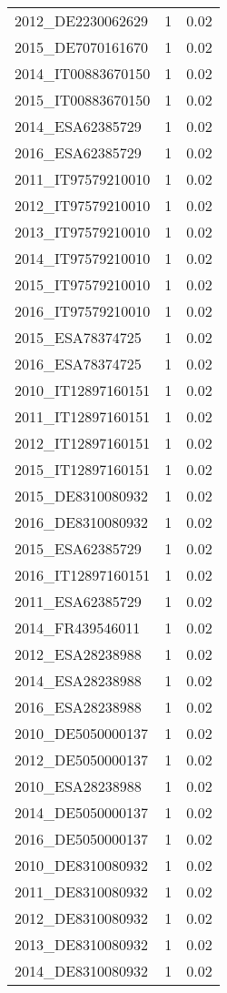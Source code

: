 \begin{table*}[htbp]
\begin{tabular}{lrr}
2012_DE2230062629 & 1 & 0.02 \\
2015_DE7070161670 & 1 & 0.02 \\
2014_IT00883670150 & 1 & 0.02 \\
2015_IT00883670150 & 1 & 0.02 \\
2014_ESA62385729 & 1 & 0.02 \\
2016_ESA62385729 & 1 & 0.02 \\
2011_IT97579210010 & 1 & 0.02 \\
2012_IT97579210010 & 1 & 0.02 \\
2013_IT97579210010 & 1 & 0.02 \\
2014_IT97579210010 & 1 & 0.02 \\
2015_IT97579210010 & 1 & 0.02 \\
2016_IT97579210010 & 1 & 0.02 \\
2015_ESA78374725 & 1 & 0.02 \\
2016_ESA78374725 & 1 & 0.02 \\
2010_IT12897160151 & 1 & 0.02 \\
2011_IT12897160151 & 1 & 0.02 \\
2012_IT12897160151 & 1 & 0.02 \\
2015_IT12897160151 & 1 & 0.02 \\
2015_DE8310080932 & 1 & 0.02 \\
2016_DE8310080932 & 1 & 0.02 \\
2015_ESA62385729 & 1 & 0.02 \\
2016_IT12897160151 & 1 & 0.02 \\
2011_ESA62385729 & 1 & 0.02 \\
2014_FR439546011 & 1 & 0.02 \\
2012_ESA28238988 & 1 & 0.02 \\
2014_ESA28238988 & 1 & 0.02 \\
2016_ESA28238988 & 1 & 0.02 \\
2010_DE5050000137 & 1 & 0.02 \\
2012_DE5050000137 & 1 & 0.02 \\
2010_ESA28238988 & 1 & 0.02 \\
2014_DE5050000137 & 1 & 0.02 \\
2016_DE5050000137 & 1 & 0.02 \\
2010_DE8310080932 & 1 & 0.02 \\
2011_DE8310080932 & 1 & 0.02 \\
2012_DE8310080932 & 1 & 0.02 \\
2013_DE8310080932 & 1 & 0.02 \\
2014_DE8310080932 & 1 & 0.02 \\

\end{tabular}
\end{table*}
